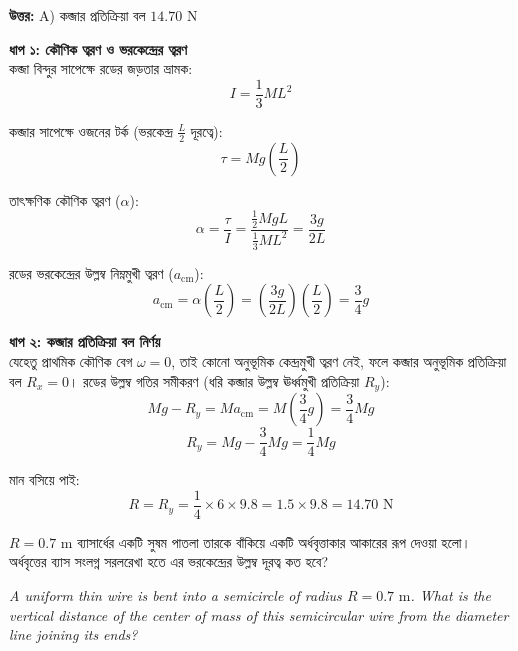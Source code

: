 \documentclass[12pt, a4paper]{article}
\begin{document}
{{\vspace{0.5em}
\begin{tcolorbox}[answerbox]
    \textbf{\color{success} উত্তর:} A) কব্জার প্রতিক্রিয়া বল $14.70\text{ N}$
\end{tcolorbox}
\vspace{1em}

\begin{tcolorbox}[solutionbox={সমাধান (Solution)}]
    \noindent
    \textbf{ধাপ ১: কৌণিক ত্বরণ ও ভরকেন্দ্রের ত্বরণ} \\
    কব্জা বিন্দুর সাপেক্ষে রডের জড়তার ভ্রামক:
    \[ I = \frac{1}{3} M L^2 \]
    
    কব্জার সাপেক্ষে ওজনের টর্ক (ভরকেন্দ্র $\frac{L}{2}$ দূরত্বে):
    \[ \tau = M g \left(\frac{L}{2}\right) \]
    
    তাৎক্ষণিক কৌণিক ত্বরণ ($\alpha$):
    \[ \alpha = \frac{\tau}{I} = \frac{\frac{1}{2} M g L}{\frac{1}{3} M L^2} = \frac{3g}{2L} \]
    
    রডের ভরকেন্দ্রের উল্লম্ব নিম্নমুখী ত্বরণ ($a_{\text{cm}}$):
    \[ a_{\text{cm}} = \alpha \left(\frac{L}{2}\right) = \left(\frac{3g}{2L}\right) \left(\frac{L}{2}\right) = \frac{3}{4} g \]
    
    \vspace{0.5em}
    \noindent\textbf{ধাপ ২: কব্জার প্রতিক্রিয়া বল নির্ণয়} \\
    যেহেতু প্রাথমিক কৌণিক বেগ $\omega = 0$, তাই কোনো অনুভূমিক কেন্দ্রমুখী ত্বরণ নেই, ফলে কব্জার অনুভূমিক প্রতিক্রিয়া বল $R_x = 0$। 
    রডের উল্লম্ব গতির সমীকরণ (ধরি কব্জার উল্লম্ব ঊর্ধ্বমুখী প্রতিক্রিয়া $R_y$):
    \[ M g - R_y = M a_{\text{cm}} = M \left(\frac{3}{4} g\right) = \frac{3}{4} M g \]
    \[ R_y = M g - \frac{3}{4} M g = \frac{1}{4} M g \]
    
    মান বসিয়ে পাই:
    \[ R = R_y = \frac{1}{4} \times 6 \times 9.8 = 1.5 \times 9.8 = \mathbf{14.70}\text{ N} \]
\end{tcolorbox}

\begin{tcolorbox}[questionbox={প্রশ্ন (Question) 30}]
    \noindent
    $R = 0.7\text{ m}$ ব্যাসার্ধের একটি সুষম পাতলা তারকে বাঁকিয়ে একটি অর্ধবৃত্তাকার আকারের রূপ দেওয়া হলো। অর্ধবৃত্তের ব্যাস সংলগ্ন সরলরেখা হতে এর ভরকেন্দ্রের উল্লম্ব দূরত্ব কত হবে?
    
    \vspace{0.8em}
    \begin{english}
    \noindent\textit{\color{darkgray}
    A uniform thin wire is bent into a semicircle of radius $R = 0.7\text{ m}$. What is the vertical distance of the center of mass of this semicircular wire from the diameter line joining its ends?
    }
    \end{english}
\end{tcolorbox}

}}
\end{document}
